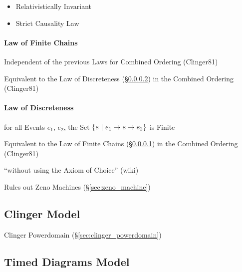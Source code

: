 \begin{itemize}
  \item Relativistically Invariant
  \item Strict Causality Law
\end{itemize}



\paragraph{Law of Finite Chains}\label{sec:finite_chain_law}\hfill

Independent of the previous Laws for Combined Ordering (Clinger81)

Equivalent to the Law of Discreteness (\S\ref{sec:discreteness_law})
in the Combined Ordering (Clinger81)


\paragraph{Law of Discreteness}\label{sec:discreteness_law}\hfill

for all Events $e_1$, $e_2$, the Set $\{ e \ |\ e_1 \rightarrow e \rightarrow
e_2 \}$ is Finite

Equivalent to the Law of Finite Chains (\S\ref{sec:finite_chain_law})
in the Combined Ordering (Clinger81)

``without using the Axiom of Choice'' (wiki) %

\fist Rules out Zeno Machines (\S\ref{sec:zeno_machine})



\subsection{Clinger Model}\label{sec:clinger_model}

Clinger Powerdomain (\S\ref{sec:clinger_powerdomain})



\subsection{Timed Diagrams Model}\label{sec:timed_diagrams}

